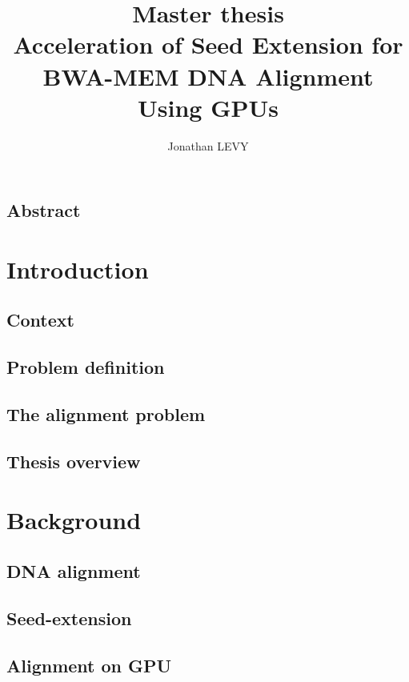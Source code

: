 \documentclass[11pt,a4paper]{report}
\author{Jonathan LEVY}
\title{Master thesis \\ Acceleration of Seed Extension for BWA-MEM DNA Alignment Using GPUs}
\begin{document}
	\maketitle
	
	\section*{Abstract}
	
	
	\tableofcontents
	
	\chapter{Introduction}
	\label{chap:intro}
	
	
		\section{Context}
		
		
		\section{Problem definition}
		
		
		\section{The alignment problem}
		
	
		\section{Thesis overview}
		
		
	\chapter{Background}
	\label{chap:background}
		\section{DNA alignment}
		
		
		\section{Seed-extension}
		
		
		\section{Alignment on GPU}
		
		
\end{document}
